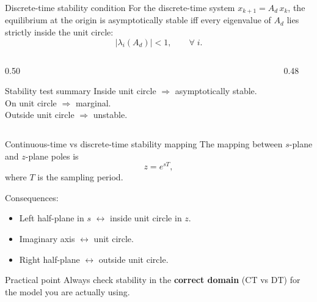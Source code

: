 \documentclass[aspectratio=169,10pt]{beamer}
\begin{document}
\begin{frame}{Discrete-time stability condition}
For the discrete-time system $x_{k+1}=A_d\,x_k$,
the equilibrium at the origin is asymptotically stable iff
every eigenvalue of $A_d$ lies strictly inside the unit circle:
\[
|\lambda_i(A_d)|<1,\qquad \forall\;i.
\]

\begin{columns}[T,totalwidth=\textwidth]
\begin{column}{0.50\textwidth}
\begin{alertbox}{Stability test summary}
Inside unit circle $\Rightarrow$ asymptotically stable.\\
On unit circle $\Rightarrow$ marginal.\\
Outside unit circle $\Rightarrow$ unstable.
\end{alertbox}
\end{column}
\begin{column}{0.48\textwidth}
\begin{center}
\end{center}
\end{column}
\end{columns}
\end{frame}

\begin{frame}{Continuous-time vs discrete-time stability mapping}
The mapping between $s$-plane and $z$-plane poles is
\[
z = e^{sT},
\]
where $T$ is the sampling period.

\medskip
Consequences:
\begin{itemize}
  \item Left half-plane in $s$ $\longleftrightarrow$ inside unit circle in $z$.
  \item Imaginary axis $\longleftrightarrow$ unit circle.
  \item Right half-plane $\longleftrightarrow$ outside unit circle.
\end{itemize}

\begin{notebox}{Practical point}
Always check stability in the \textbf{correct domain} (CT vs DT) for the
model you are actually using.
\end{notebox}
\end{frame}
\end{document}
